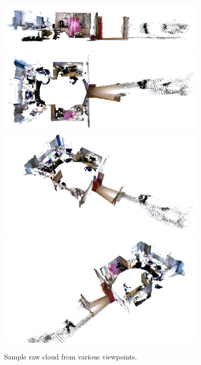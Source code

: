 \documentclass[11pt,a4paper]{kth-mag}
\begin{document}
\begin{figure}
  \centering
  \includegraphics[width=0.9\textwidth]{images/orig_side}
  \includegraphics[width=0.9\textwidth]{images/orig_top}
  \includegraphics[width=0.9\textwidth]{images/orig_diag_left}
  \includegraphics[width=0.9\textwidth]{images/orig_diag_right}
  \caption{Sample raw cloud from various viewpoints.}
  \label{fig:orig}
\end{figure}
\end{document}
